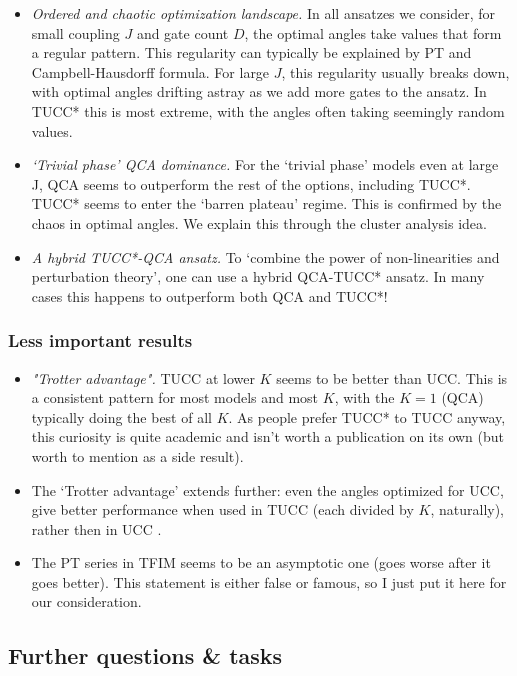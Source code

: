 \documentclass[10pt, a4paper]{article}
\begin{document}
\begin{itemize}
\item \textit{Ordered and chaotic optimization landscape.} In all ansatzes we consider, for small coupling $J$ and gate count $D$, the optimal angles take values that form a regular pattern. This regularity can typically be explained by PT and Campbell-Hausdorff formula. For large $J$, this regularity usually breaks down, with optimal angles drifting astray as we add more gates to the ansatz. In TUCC* this is most extreme, with the angles often taking seemingly random values. 
\item \textit{`Trivial phase' QCA dominance.} For the `trivial phase' models even at large J, QCA seems to outperform the rest of the options, including TUCC*. TUCC* seems to enter the `barren plateau' regime. This is confirmed by the chaos in optimal angles. We explain this through the cluster analysis idea.
\item \textit{A hybrid TUCC*-QCA ansatz.} To `combine the power of non-linearities and perturbation theory', one can use a hybrid QCA-TUCC* ansatz. In many cases this happens to outperform both QCA and TUCC*!
\end{itemize}

\subsubsection*{Less important results}
\begin{itemize}
\item \textit{"Trotter advantage".} TUCC at lower $K$ seems to be better than UCC. This is a consistent pattern for most models and most $K$, with the $K=1$ (QCA) typically doing the best of all $K$. As people prefer TUCC* to TUCC anyway, this curiosity is quite academic and isn't worth a publication on its own (but worth to mention as a side result).

\item The `Trotter advantage' extends further: even the angles optimized for UCC, give better performance when used in TUCC (each divided by $K$, naturally), rather then in UCC .

\item The PT series in TFIM seems to be an asymptotic one (goes worse after it goes better). This statement is either false or famous, so I just put it here for our consideration.
\end{itemize}

\subsection*{Further questions \& tasks}
\end{document}
